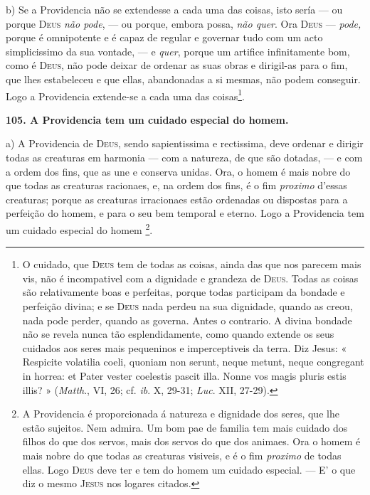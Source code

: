 b) Se a Providencia não se extendesse a cada uma das coisas, isto sería --- ou porque \textsc{Deus} \emph{não pode}, --- ou porque, embora possa, \emph{não quer}. Ora \textsc{Deus} --- \emph{pode,} porque é omnipotente e é capaz de regular e governar tudo com um acto simplicissimo da sua vontade, --- e \emph{quer}, porque um artifice infinitamente bom, como é \textsc{Deus}, não pode deixar de ordenar as suas obras e dirigil-as para o fim, que lhes estabeleceu e que ellas, abandonadas a si mesmas, não podem conseguir. Logo a Providencia extende-se a cada uma das coisas\footnote{O cuidado, que \textsc{Deus} tem de todas as coisas, ainda das que nos parecem mais vis, não é incompativel com a dignidade e grandeza de \textsc{Deus}. Todas as coisas são relativamente boas e perfeitas, porque todas participam da bondade e perfeição divina; e se \textsc{Deus} nada perdeu na sua dignidade, quando as creou, nada pode perder, quando as governa. Antes o contrario. A divina bondade não se revela nunca tão esplendidamente, como quando extende os seus cuidados aos seres mais pequeninos e imperceptiveis da terra. Diz Jesus: « Respicite volatilia coeli, quoniam non serunt, neque metunt, neque congregant in horrea: et Pater vester coelestis pascit illa. Nonne vos magis pluris estis illis? » (\emph{Matth}., VI, 26; cf. \emph{ib}. X, 29-31; \emph{Luc}. XII, 27-29).}.

\textbf{105. A Providencia tem um cuidado especial do homem.}

a) A Providencia de \textsc{Deus}, sendo sapientissima e rectissima, deve ordenar e dirigir todas as creaturas em harmonia --- com a natureza, de que são dotadas, --- e com a ordem dos fins,   que as une e conserva unidas. Ora, o homem é mais nobre do que todas as creaturas racionaes, e, na ordem dos fins, é o fim \emph{proximo} d'essas creaturas; porque as creaturas irracionaes estão ordenadas ou dispostas para a perfeição do homem, e para o seu bem temporal e eterno. Logo a Providencia tem um cuidado especial do homem \footnote{A Providencia é proporcionada á natureza e dignidade dos seres, que lhe estão sujeitos. Nem admira. Um bom pae de familia tem mais cuidado dos filhos do que dos servos, mais dos servos do que dos animaes. Ora o homem é mais nobre do que todas as creaturas visiveis, e é o fim \emph{proximo} de todas ellas. Logo \textsc{Deus} deve ter e tem do homem um cuidado especial. --- E' o que diz o mesmo \textsc{Jesus} nos logares citados.}.

